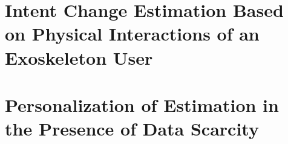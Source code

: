 	
	\tableofcontents
	\listoffigures
	\listoftables
	
	
	
	 
	
	\mainmatter
	
	
	
	\chapter{Intent Change Estimation Based on Physical Interactions of an	Exoskeleton User}\label{chapter:BKF}
	\chapter{Personalization of Estimation in the Presence of Data Scarcity}\label{chapter:MP}
	
	
	\appendix
	
	
	\backmatter              %
	
	
	
	
	


\endinput
